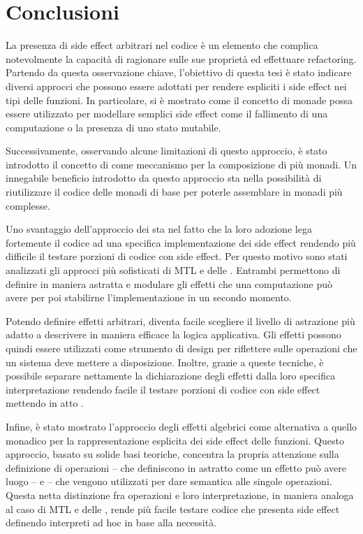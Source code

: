 \chapter{Conclusioni}

La presenza di side effect arbitrari nel codice è un elemento che complica notevolmente la capacità di ragionare sulle sue proprietà ed effettuare refactoring.
Partendo da questa osservazione chiave, l'obiettivo di questa tesi è stato indicare diversi approcci che possono essere adottati per rendere espliciti i side effect nei tipi delle funzioni.
In particolare, si è mostrato come il concetto di monade possa essere utilizzato per modellare semplici side effect come il fallimento di una computazione o la presenza di uno stato mutabile.

Successivamente, osservando alcune limitazioni di questo approccio, è stato introdotto il concetto di  come meccanismo per la composizione di più monadi.
Un innegabile beneficio introdotto da questo approccio sta nella possibilità di riutilizzare il codice delle monadi di base per poterle assemblare in monadi più complesse.

Uno svantaggio dell'approccio dei  sta nel fatto che la loro adozione lega fortemente il codice ad una specifica implementazione dei side effect rendendo più difficile il testare porzioni di codice con side effect.
Per questo motivo sono stati analizzati gli approcci più sofisticati di \ac{MTL} e delle .
Entrambi permettono di definire in maniera astratta e modulare gli effetti che una computazione può avere per poi stabilirne l'implementazione in un secondo momento.

Potendo definire effetti arbitrari, diventa facile scegliere il livello di astrazione più adatto a descrivere in maniera efficace la logica applicativa.
Gli effetti possono quindi essere utilizzati come strumento di design per riflettere sulle operazioni che un sistema deve mettere a disposizione.
Inoltre, grazie a queste tecniche, è possibile separare nettamente la dichiarazione degli effetti dalla loro specifica interpretazione rendendo facile il testare porzioni di codice con side effect mettendo in atto .

Infine, è stato mostrato l'approccio degli effetti algebrici come alternativa a quello monadico per la rappresentazione esplicita dei side effect delle funzioni.
Questo approccio, basato su solide basi teoriche, concentra la propria attenzione sulla definizione di operazioni -- che definiscono in astratto come un effetto può avere luogo -- e  -- che vengono utilizzati per dare semantica alle singole operazioni.
Questa netta distinzione fra operazioni e loro interpretazione, in maniera analoga al caso di \ac{MTL} e delle , rende più facile testare codice che presenta side effect definendo interpreti ad hoc in base alla necessità.

